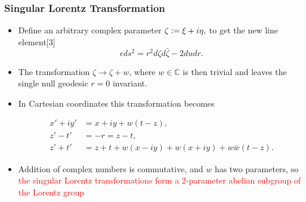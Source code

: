 \documentclass[10pt,a4paper]{beamer}
\begin{document}
\begin{frame}
\frametitle{Singular Lorentz Transformation}
\begin{itemize}
\item<1->{Define an arbitrary complex parameter $\zeta \vcentcolon= \xi + i \eta ,$ to get the new line element[3] $$\epsilon {ds^2} = r^2 {d\zeta}{d\bar{\zeta}} - 2 {du}{dr}.$$}
\item<2->{The transformation $\zeta \rightarrow \zeta + w$, where $w \in \mathbb{C}$ is then trivial and leaves the single null geodesic $r = 0$ invariant.}
\item<3->{In Cartesian coordinates this transformation becomes

\begin{align}\nonumber
x' + i y' & = x + iy + w(t-z), \\\nonumber
z' - t' & = -r = z - t, \\\nonumber
z' + t' & = z+t + w(x - i y) + w(x + iy) + w\bar{w} (t-z).
\end{align}
}
\item<4->{Addition of complex numbers is commutative, and $w$ has two parameters, so \textcolor{red}{the singular Lorentz transformations form a 2-parameter abelian subgroup of the Lorentz group}}

\end{itemize}


\end{frame}
\end{document}
